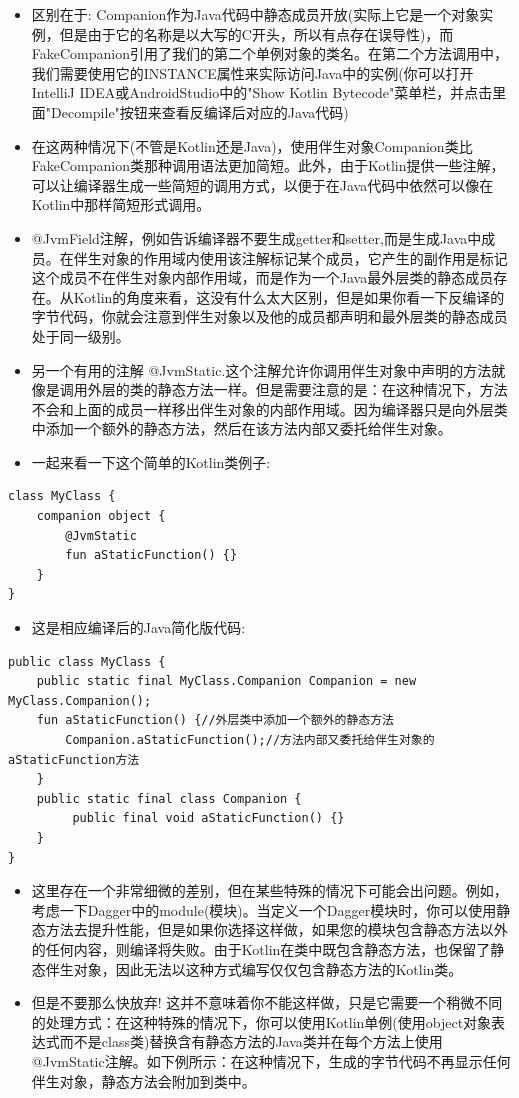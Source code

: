 \documentclass[9pt, b5paper]{article}
\begin{document}
\begin{itemize}
\item 区别在于: Companion作为Java代码中静态成员开放(实际上它是一个对象实例，但是由于它的名称是以大写的C开头，所以有点存在误导性)，而FakeCompanion引用了我们的第二个单例对象的类名。在第二个方法调用中，我们需要使用它的INSTANCE属性来实际访问Java中的实例(你可以打开IntelliJ IDEA或AndroidStudio中的"Show Kotlin Bytecode"菜单栏，并点击里面"Decompile"按钮来查看反编译后对应的Java代码)
\item 在这两种情况下(不管是Kotlin还是Java)，使用伴生对象Companion类比FakeCompanion类那种调用语法更加简短。此外，由于Kotlin提供一些注解，可以让编译器生成一些简短的调用方式，以便于在Java代码中依然可以像在Kotlin中那样简短形式调用。
\item @JvmField注解，例如告诉编译器不要生成getter和setter,而是生成Java中成员。在伴生对象的作用域内使用该注解标记某个成员，它产生的副作用是标记这个成员不在伴生对象内部作用域，而是作为一个Java最外层类的静态成员存在。从Kotlin的角度来看，这没有什么太大区别，但是如果你看一下反编译的字节代码，你就会注意到伴生对象以及他的成员都声明和最外层类的静态成员处于同一级别。
\item 另一个有用的注解 @JvmStatic.这个注解允许你调用伴生对象中声明的方法就像是调用外层的类的静态方法一样。但是需要注意的是：在这种情况下，方法不会和上面的成员一样移出伴生对象的内部作用域。因为编译器只是向外层类中添加一个额外的静态方法，然后在该方法内部又委托给伴生对象。
\item 一起来看一下这个简单的Kotlin类例子:
\end{itemize}
\begin{verbatim}
class MyClass {
    companion object {
        @JvmStatic
        fun aStaticFunction() {}
    }
}
\end{verbatim}
\begin{itemize}
\item 这是相应编译后的Java简化版代码:
\end{itemize}
\begin{verbatim}
public class MyClass {
    public static final MyClass.Companion Companion = new MyClass.Companion();
    fun aStaticFunction() {//外层类中添加一个额外的静态方法
        Companion.aStaticFunction();//方法内部又委托给伴生对象的aStaticFunction方法
    }
    public static final class Companion {
         public final void aStaticFunction() {}
    }
}
\end{verbatim}
\begin{itemize}
\item 这里存在一个非常细微的差别，但在某些特殊的情况下可能会出问题。例如，考虑一下Dagger中的module(模块)。当定义一个Dagger模块时，你可以使用静态方法去提升性能，但是如果你选择这样做，如果您的模块包含静态方法以外的任何内容，则编译将失败。由于Kotlin在类中既包含静态方法，也保留了静态伴生对象，因此无法以这种方式编写仅仅包含静态方法的Kotlin类。
\item 但是不要那么快放弃! 这并不意味着你不能这样做，只是它需要一个稍微不同的处理方式：在这种特殊的情况下，你可以使用Kotlin单例(使用object对象表达式而不是class类)替换含有静态方法的Java类并在每个方法上使用@JvmStatic注解。如下例所示：在这种情况下，生成的字节代码不再显示任何伴生对象，静态方法会附加到类中。
\end{itemize}
\end{document}
